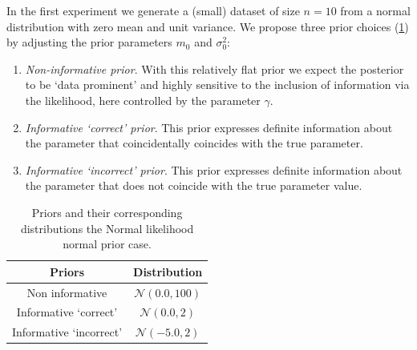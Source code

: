 \documentclass[12pt]{article}
\begin{document}
In the first experiment we generate a (small) dataset of size $n = 10$ from a
normal distribution with zero mean and unit variance. We propose three prior
choices (\cref{priors_inorm_norm}) by adjusting the prior parameters $m_0$ and $\sigma_0^2$:
\begin{enumerate}
\item \emph{Non-informative prior}.  With
this relatively flat prior we expect the posterior to be `data prominent'
and highly sensitive to the inclusion of information via the likelihood,
here controlled by the parameter $\gamma$.
\item \emph{Informative `correct' prior}.
This prior expresses definite information about the parameter that
coincidentally coincides with the true parameter. 
\item \emph{Informative `incorrect' prior}.
This prior expresses definite information about the parameter that
does not coincide with the true parameter value. 
\end{enumerate}

\begin{table}[h!]
	\caption{Priors and their corresponding distributions the Normal likelihood normal prior case.}
	\renewcommand{\arraystretch}{1.5}
	\centering
	\begin{tabular}{cc}
		\toprule
		Priors   & Distribution \\
		\midrule
		Non informative  &  $\mathcal{N}(0.0, 100) $   \\
				Informative    `correct'  & $\mathcal{N}(0.0, 2)$\\
		Informative `incorrect'  & $\mathcal{N}(-5.0, 2)$    \\
		\bottomrule
	\end{tabular}
	\label{priors_inorm_norm}
\end{table}
\end{document}

